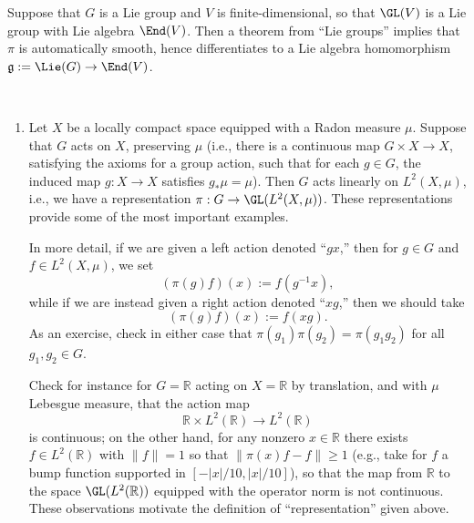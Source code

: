 \documentclass[reqno]{amsart} 
\begin{document}
\begin{remark}
  Suppose that $G$ is a Lie group and $V$ is finite-dimensional, so that $\GL(V)$ is a Lie group with Lie algebra $\End(V)$.  Then a theorem from ``Lie groups'' implies that $\pi$ is automatically smooth, hence differentiates to a Lie algebra homomorphism $\mathfrak{g} := \Lie(G) \rightarrow \End(V)$.
\end{remark}


\begin{example}
~
  \begin{enumerate}
  \item Let $X$ be a locally compact space equipped with a Radon measure $\mu$.  Suppose that $G$ acts on $X$, preserving $\mu$ (i.e., there is a continuous map $G \times X \rightarrow X$, satisfying the axioms for a group action, such that for each $g \in G$, the induced map $g : X \rightarrow X$ satisfies $g_* \mu = \mu$).  Then $G$ acts linearly on $L^2(X,\mu)$, i.e., we have a representation $\pi : G \rightarrow \GL(L^2(X,\mu))$.  These representations provide some of the most important examples.

    In more detail, if we are given a left action denoted ``$g x$,'' then for $g \in G$ and $f \in L^2(X,\mu)$, we set
    \begin{equation}\label{eq:action-on-functions-induced-by-left-translation}
      (\pi(g) f)(x) := f(g^{-1} x),
    \end{equation}
    while if we are instead given a right action denoted ``$x g$,'' then we should take
    \begin{equation}\label{eq:action-on-functions-induced-by-right-translation}
      (\pi(g) f)(x) := f(x g).
    \end{equation}
    As an exercise, check in either case that $\pi(g_1) \pi(g_2) = \pi(g_1 g_2)$ for all $g_1, g_2 \in G$.

    Check for instance for $G = \mathbb{R}$ acting on $X = \mathbb{R}$ by translation, and with $\mu$ Lebesgue measure, that the action map
    \begin{equation*}
      \mathbb{R} \times L^2(\mathbb{R}) \rightarrow L^2(\mathbb{R})
    \end{equation*}
    is continuous; on the other hand, for any nonzero $x \in \mathbb{R}$ there exists $f \in L^2(\mathbb{R})$ with $\|f\| = 1$ so that $\|\pi(x) f - f \| \geq 1$ (e.g., take for $f$ a bump function supported in $[-|x|/10, |x|/10]$), so that the map from $\mathbb{R}$ to the space $\GL(L^2(\mathbb{R}))$ equipped with the operator norm is not continuous.  These observations motivate the definition of ``representation'' given above.
    

\end{enumerate}
\end{example}
\end{document}
